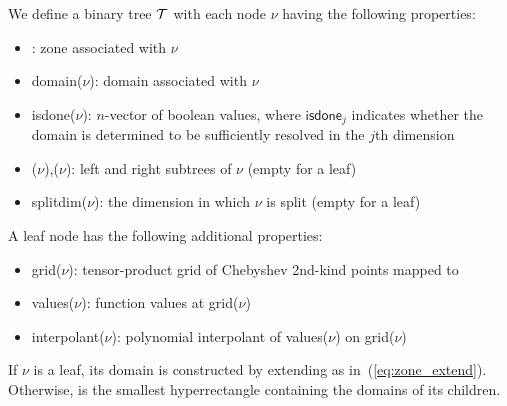 We define a binary tree $\mathcal{T}$ with each node $\nu$ having the following properties:
\begin{itemize}
\item {}: zone associated with $\nu$
\item \textsf{domain}($\nu$): domain associated with $\nu$
\item \textsf{isdone}($\nu$): $n$-vector of boolean values, where $\textsf{isdone}_j$ indicates whether the domain is determined to be sufficiently resolved in the $j$th dimension
\item {}($\nu$),($\nu$): left and right subtrees of $\nu$ (empty for a leaf)
\item \textsf{splitdim}($\nu$): the dimension in which $\nu$ is split (empty for a leaf)
\end{itemize}

\noindent A leaf node has the following additional properties:
\begin{itemize}
\item \textsf{grid}($\nu$): tensor-product grid of Chebyshev 2nd-kind points mapped to 
\item \textsf{values}($\nu$): function values at \textsf{grid}($\nu$)
\item \textsf{interpolant}($\nu$): polynomial interpolant of \textsf{values}($\nu$) on \textsf{grid}($\nu$)
\end{itemize}

\noindent If $\nu$ is a leaf, its domain is constructed by extending  as in~(\ref{eq:zone_extend}). Otherwise,  is the smallest hyperrectangle containing the domains of its children. 

